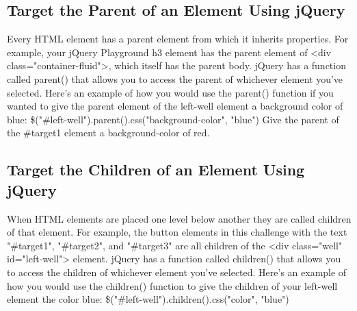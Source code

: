 \documentclass{article}%
\begin{document}
%
\subsection{Target the Parent of an Element Using jQuery}%
\label{subsec:TargettheParentofanElementUsingjQuery}%
Every HTML element has a parent element from which it inherits properties.\newline%
For example, your jQuery Playground h3 element has the parent element of <div class="container{-}fluid">, which itself has the parent body.\newline%
jQuery has a function called parent() that allows you to access the parent of whichever element you've selected.\newline%
Here's an example of how you would use the parent() function if you wanted to give the parent element of the left{-}well element a background color of blue:\newline%
\$("\#left{-}well").parent().css("background{-}color", "blue")\newline%
Give the parent of the \#target1 element a background{-}color of red.\newline%

%
\subsection{Target the Children of an Element Using jQuery}%
\label{subsec:TargettheChildrenofanElementUsingjQuery}%
When HTML elements are placed one level below another they are called children of that element. For example, the button elements in this challenge with the text "\#target1", "\#target2", and "\#target3" are all children of the <div class="well" id="left{-}well"> element.\newline%
jQuery has a function called children() that allows you to access the children of whichever element you've selected.\newline%
Here's an example of how you would use the children() function to give the children of your left{-}well element the color blue:\newline%
\$("\#left{-}well").children().css("color", "blue")\newline%

%
\end{document}
